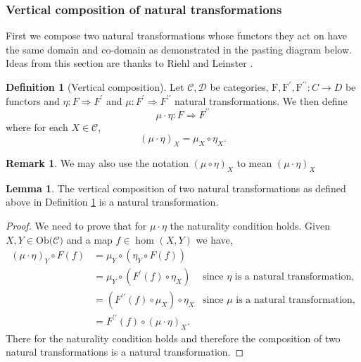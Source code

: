 \documentclass[11pt,a4paper]{article}
\theoremstyle{definition}
\newtheorem{lemma}[thm]{Lemma}
\newtheorem{definition}[thm]{Definition}
\newtheorem{remark}[thm]{Remark}
\newcommand\ho[3][]{\hom_{#1}(#2,#3)}
\newcommand\ob[1]{\mathrm{Ob(}#1\mathrm{)}}
\newcommand\cat[1]{\mathscr{#1}}
\newcommand\func[3]{\mathrm{#1}\colon#2\rightarrow#3}
\newcommand\nattran[3]{#1\colon#2\Rightarrow#3}
\numberwithin{equation}{section}
\begin{document}
\subsubsection{Vertical composition of natural transformations}
\label{sss:vertcompnaturaltransformations} 
First we compose two natural transformations whose functors they act on have the same domain and co-domain as demonstrated in the pasting diagram below. Ideas from this section are thanks to Riehl \cite{Riehl} and Leinster \cite{Leinster}.
\begin{center}
\end{center}
\begin{definition}[Vertical composition]
\label{def:vertcomp}
Let $\cat{C},\cat{D}$ be categories, $\func{F,F^\prime,F^{\prime\prime}}{C}{D}$ be functors and $\nattran{\eta}{F}{F^\prime}$ and $\nattran{\mu}{F^\prime}{F^{\prime\prime}}$ natural transformations. We then define 
\[\nattran{\mu\cdot\eta}{F}{F^{\prime\prime}}\]
where for each $X\in\cat{C}$,
\[(\mu\cdot\eta)_{X}= \mu_{X}\circ\eta_{X}.\]
\end{definition}
\begin{remark}
    We may also use the notation $(\mu\circ\eta)_{X}$ to mean $(\mu\cdot\eta)_{X}$
\end{remark}
\begin{lemma}
The vertical composition of two natural transformations as defined above in Definition \ref{def:vertcomp} is a natural transformation.
\end{lemma}
\begin{proof}
We need to prove that for $\mu\cdot\eta$ the naturality condition holds. Given $X,Y\in\ob{\mathscr{C}}$ and a map $f\in\ho{X}{Y}$ we have,
\begin{align*}
    (\mu\cdot\eta)_{Y}\circ F(f) &= \mu_{Y}\circ(\eta_{Y}\circ F(f))\\
    &= \mu_{Y}\circ (F^{\prime}(f) \circ\eta_{X}) &\text{since $\eta$ is a natural transformation,}\\
    &= (F^{\prime\prime}(f)\circ\mu_{X})\circ\eta_{X}&\text{since $\mu$ is a natural transformation,}\\
    &= F^{\prime\prime}(f)\circ(\mu\cdot\eta)_{X}.
\end{align*}
There for the naturality condition holds and therefore the composition of two natural transformations is a natural transformation.
\end{proof}
\end{document}
